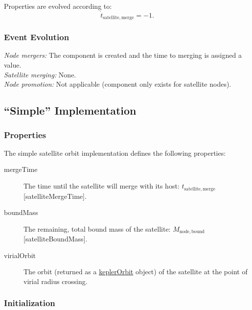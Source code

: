 Properties are evolved according to:
\begin{equation}
 \dot{t}_\mathrm{satellite, merge} = -1.
\end{equation}

\subsubsection{Event Evolution}

\noindent\emph{Node mergers:} The \gls{component} is created and the time to merging is assigned a value.\\

\noindent\emph{Satellite merging:} None.\\

\noindent\emph{Node promotion:} Not applicable (component only exists for satellite nodes).\\

\subsection{``Simple'' Implementation}\label{sec:SatelliteOrbitComponentSimple}

\subsubsection{Properties}

The simple satellite orbit implementation defines the following properties:
\begin{description}
 \item [{\normalfont \ttfamily mergeTime}] The time until the satellite will merge with its host: $t_\mathrm{satellite, merge}$ [{\normalfont \ttfamily satelliteMergeTime}].
 \item [{\normalfont \ttfamily boundMass}] The remaining, total bound mass of the satellite: $M_\mathrm{node,bound}$ [{\normalfont \ttfamily satelliteBoundMass}].
 \item[{\normalfont \ttfamily virialOrbit}] The orbit (returned as a \href{https://github.com/galacticusorg/galacticus/releases/download/masterRelease/Galacticus_Development.pdf\#sec.KeplerOrbits}{\normalfont \ttfamily keplerOrbit} object) of the satellite at the point of virial radius crossing.
\end{description}

\subsubsection{Initialization}

